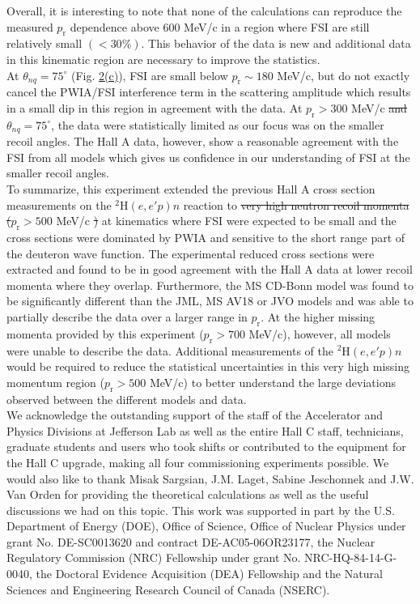 \documentclass[aps,prl,twocolumn,showpacs,superscriptaddress,groupedaddress]{revtex4-2}  %
\providecommand{\DIFaddtex}[1]{{\protect\color{blue}\uwave{#1}}} %
\providecommand{\DIFdeltex}[1]{{\protect\color{red}\sout{#1}}}                      %
\providecommand{\DIFaddbegin}{} %
\providecommand{\DIFaddend}{} %
\providecommand{\DIFdelbegin}{} %
\providecommand{\DIFdelend}{} %
\providecommand{\DIFadd}[1]{\texorpdfstring{\DIFaddtex{#1}}{#1}} %
\providecommand{\DIFdel}[1]{\texorpdfstring{\DIFdeltex{#1}}{}} %
\newcommand{\DIFscaledelfig}{0.5}
\newlength{\DIFdelgraphicswidth} %
\newlength{\DIFdelgraphicsheight} %
\newcommand{\DIFaddincludegraphics}[2][]{{\color{blue}\fbox{\DIFOincludegraphics[#1]{#2}}}} %
\newcommand{\DIFdelincludegraphics}[2][]{%
\sbox{\DIFdelgraphicsbox}{\DIFOincludegraphics[#1]{#2}}%
\settoboxwidth{\DIFdelgraphicswidth}{\DIFdelgraphicsbox} %
\settoboxtotalheight{\DIFdelgraphicsheight}{\DIFdelgraphicsbox} %
\scalebox{\DIFscaledelfig}{%
\parbox[b]{\DIFdelgraphicswidth}{\usebox{\DIFdelgraphicsbox}\\[-\baselineskip] \rule{\DIFdelgraphicswidth}{0em}}\llap{\resizebox{\DIFdelgraphicswidth}{\DIFdelgraphicsheight}{%
\setlength{\unitlength}{\DIFdelgraphicswidth}%
\begin{picture}(1,1)%
\thicklines\linethickness{2pt} %
{\color[rgb]{1,0,0}\put(0,0){\framebox(1,1){}}}%
{\color[rgb]{1,0,0}\put(0,0){\line( 1,1){1}}}%
{\color[rgb]{1,0,0}\put(0,1){\line(1,-1){1}}}%
\end{picture}%
}\hspace*{3pt}}} %
} %
\DeclareRobustCommand{\DIFaddbegin}{\DIFOaddbegin \let\includegraphics\DIFaddincludegraphics} %
\DeclareRobustCommand{\DIFaddend}{\DIFOaddend \let\includegraphics\DIFOincludegraphics} %
\DeclareRobustCommand{\DIFdelbegin}{\DIFOdelbegin \let\includegraphics\DIFdelincludegraphics} %
\DeclareRobustCommand{\DIFdelend}{\DIFOaddend \let\includegraphics\DIFOincludegraphics} %
\begin{document}
\indent Overall, it is interesting to note that none of the calculations can reproduce the measured $p_{\mathrm{r}}$ dependence above 600 MeV/c in a
region where FSI are still relatively small $(<30\%)$. This behavior of the data is new and additional data in this kinematic region are necessary
to improve the statistics. \\
\indent At $\theta_{nq}=75^{\circ}$ (Fig. \hyperref[fig:fig2]{2(c)}), FSI are small below $p_{\mathrm{r}}\sim180$ MeV/c, but do not exactly cancel the PWIA/FSI interference term in the scattering amplitude which results in a small dip in this region in agreement with the data.
At $p_{\mathrm{r}}>300$ MeV/c \DIFdelbegin \DIFdel{and }\DIFdelend \DIFaddbegin \DIFadd{(}\DIFaddend $\theta_{nq}=75^{\circ}$\DIFaddbegin \DIFadd{)}\DIFaddend , the data were statistically limited as our focus was on the smaller recoil angles. The Hall A data, however, show a reasonable agreement with the FSI from all models
which gives us confidence in our understanding of FSI at the smaller recoil angles. \\
\indent To summarize, this experiment extended the previous Hall A cross section measurements on the $^{2}\mathrm{H}(e,e'p)n$ reaction to 
\DIFdelbegin \DIFdel{very high neutron recoil momenta (}\DIFdelend $p_{\mathrm{r}}>500$ MeV/c \DIFdelbegin \DIFdel{) }\DIFdelend at kinematics where FSI were expected to be small and the cross sections were dominated by PWIA and sensitive to the
short range part of the deuteron wave function. The experimental reduced cross sections were extracted and found to be in good agreement with the Hall A data at lower recoil momenta where they overlap.
Furthermore, the MS CD-Bonn model was found to be significantly different than the JML, MS AV18 or JVO models and was able to partially describe the data over a larger range in $p_{\mathrm{r}}$.
At the higher missing momenta provided by this experiment ($p_{\mathrm{r}}>700$ MeV/c), however, all models were unable to describe the data. 
Additional measurements of the $^{2}\mathrm{H}(e,e'p)n$ would be required to reduce the statistical uncertainties in this very high missing
momentum region ($p_{\mathrm{r}}>500$ MeV/c) to better understand the large deviations observed between the different models and data.\\
\indent We acknowledge the outstanding support of the staff of the Accelerator and Physics Divisions at Jefferson Lab
as well as the entire Hall C staff, technicians, graduate students and users who took shifts or contributed
to the equipment for the Hall C upgrade, making all four commissioning experiments possible. We would also like to
thank Misak Sargsian, J.M. Laget, Sabine Jeschonnek and J.W. Van Orden for providing the theoretical calculations as well as the useful
discussions we had on this topic. This work was supported in part by the U.S. Department of Energy (DOE), Office of Science, Office of Nuclear Physics
under grant No. DE-SC0013620 and contract DE-AC05-06OR23177, the Nuclear Regulatory Commission (NRC) Fellowship
under grant No. NRC-HQ-84-14-G-0040, the Doctoral Evidence Acquisition (DEA) Fellowship and the Natural Sciences and Engineering Research Council of Canada (NSERC).
\DIFaddbegin 
\end{document}
